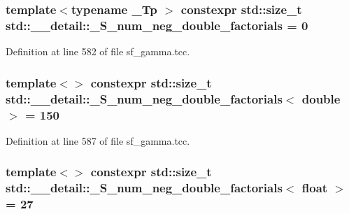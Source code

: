 \subsubsection[{\texorpdfstring{\+\_\+\+S\+\_\+num\+\_\+neg\+\_\+double\+\_\+factorials}{_S_num_neg_double_factorials}}]{\setlength{\rightskip}{0pt plus 5cm}template$<$typename \+\_\+\+Tp $>$ constexpr std\+::size\+\_\+t std\+::\+\_\+\+\_\+detail\+::\+\_\+\+S\+\_\+num\+\_\+neg\+\_\+double\+\_\+factorials = 0}\hypertarget{namespacestd_1_1____detail_ac386f200e589ce1fc895c2aac0e47f8c}{}\label{namespacestd_1_1____detail_ac386f200e589ce1fc895c2aac0e47f8c}


Definition at line 582 of file sf\+\_\+gamma.\+tcc.

\subsubsection[{\texorpdfstring{\+\_\+\+S\+\_\+num\+\_\+neg\+\_\+double\+\_\+factorials$<$ double $>$}{_S_num_neg_double_factorials< double >}}]{\setlength{\rightskip}{0pt plus 5cm}template$<$$>$ constexpr std\+::size\+\_\+t {\bf std\+::\+\_\+\+\_\+detail\+::\+\_\+\+S\+\_\+num\+\_\+neg\+\_\+double\+\_\+factorials}$<$ double $>$ = 150}\hypertarget{namespacestd_1_1____detail_a2d14a1207a6fea22f32586dfd41cf49d}{}\label{namespacestd_1_1____detail_a2d14a1207a6fea22f32586dfd41cf49d}


Definition at line 587 of file sf\+\_\+gamma.\+tcc.

\subsubsection[{\texorpdfstring{\+\_\+\+S\+\_\+num\+\_\+neg\+\_\+double\+\_\+factorials$<$ float $>$}{_S_num_neg_double_factorials< float >}}]{\setlength{\rightskip}{0pt plus 5cm}template$<$$>$ constexpr std\+::size\+\_\+t {\bf std\+::\+\_\+\+\_\+detail\+::\+\_\+\+S\+\_\+num\+\_\+neg\+\_\+double\+\_\+factorials}$<$ float $>$ = 27}\hypertarget{namespacestd_1_1____detail_a3ce62e66e9a196fd89b4d841f7374d68}{}\label{namespacestd_1_1____detail_a3ce62e66e9a196fd89b4d841f7374d68}



